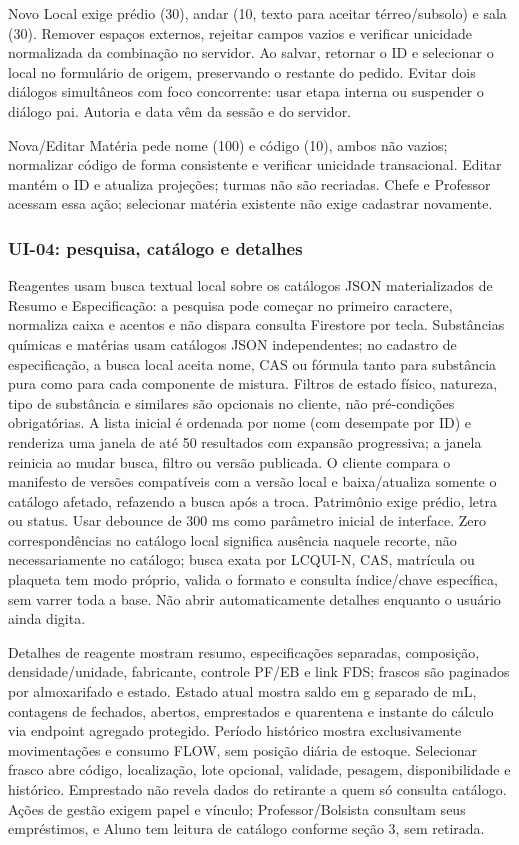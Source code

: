 Novo Local exige prédio (30), andar (10, texto para aceitar térreo/subsolo) e sala (30). Remover espaços externos, rejeitar campos vazios e verificar unicidade normalizada da combinação no servidor. Ao salvar, retornar o ID e selecionar o local no formulário de origem, preservando o restante do pedido. Evitar dois diálogos simultâneos com foco concorrente: usar etapa interna ou suspender o diálogo pai. Autoria e data vêm da sessão e do servidor.

Nova/Editar Matéria pede nome (100) e código (10), ambos não vazios; normalizar código de forma consistente e verificar unicidade transacional. Editar mantém o ID e atualiza projeções; turmas não são recriadas. Chefe e Professor acessam essa ação; selecionar matéria existente não exige cadastrar novamente.

\subsubsection{UI-04: pesquisa, catálogo e detalhes}
Reagentes usam busca textual local sobre os catálogos JSON materializados de Resumo e Especificação: a pesquisa pode começar no primeiro caractere, normaliza caixa e acentos e não dispara consulta Firestore por tecla. Substâncias químicas e matérias usam catálogos JSON independentes; no cadastro de especificação, a busca local aceita nome, CAS ou fórmula tanto para substância pura como para cada componente de mistura. Filtros de estado físico, natureza, tipo de substância e similares são opcionais no cliente, não pré-condições obrigatórias. A lista inicial é ordenada por nome (com desempate por ID) e renderiza uma janela de até 50 resultados com expansão progressiva; a janela reinicia ao mudar busca, filtro ou versão publicada. O cliente compara o manifesto de versões compatíveis com a versão local e baixa/atualiza somente o catálogo afetado, refazendo a busca após a troca. Patrimônio exige prédio, letra ou status. Usar debounce de 300 ms como parâmetro inicial de interface. Zero correspondências no catálogo local significa ausência naquele recorte, não necessariamente no catálogo; busca exata por LCQUI-N, CAS, matrícula ou plaqueta tem modo próprio, valida o formato e consulta índice/chave específica, sem varrer toda a base. Não abrir automaticamente detalhes enquanto o usuário ainda digita.

Detalhes de reagente mostram resumo, especificações separadas, composição, densidade/unidade, fabricante, controle PF/EB e link FDS; frascos são paginados por almoxarifado e estado. Estado atual mostra saldo em g separado de mL, contagens de fechados, abertos, emprestados e quarentena e instante do cálculo via endpoint agregado protegido. Período histórico mostra exclusivamente movimentações e consumo FLOW, sem posição diária de estoque. Selecionar frasco abre código, localização, lote opcional, validade, pesagem, disponibilidade e histórico. Emprestado não revela dados do retirante a quem só consulta catálogo. Ações de gestão exigem papel e vínculo; Professor/Bolsista consultam seus empréstimos, e Aluno tem leitura de catálogo conforme seção 3, sem retirada.

